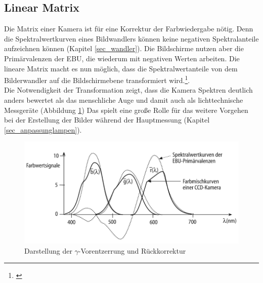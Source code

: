 \subsection{Linear Matrix}
\label{matrix}
Die Matrix einer Kamera ist für eine Korrektur der Farbwiedergabe nötig. Denn die Spektralwertkurven eines Bildwandlers können keine negativen Spektralanteile aufzeichnen können (Kapitel \ref{sec_wandler}). Die Bildschirme nutzen aber die Primärvalenzen der EBU, die wiederum mit negativen Werten arbeiten. Die lineare Matrix macht es nun möglich, dass die Spektralwertanteile von dem Bilderwandler auf die Bildschirmebene transformiert wird.\footnote{\cite[412-413]{schmidt}}.\\
Die Notwendigkeit der Transformation zeigt, dass die Kamera Spektren deutlich anders bewertet als das menschliche Auge und damit auch als lichttechnische Messgeräte (Abbildung \ref{b_matrix}) Das spielt eine große Rolle für das weitere Vorgehen bei der Erstellung der Bilder während der Hauptmessung (Kapitel \ref{sec_anpassunglampen}).

\begin{figure}[H]     %
\centering
\includegraphics[width=1.0\textwidth]{bilder/matrix} 
\caption {Darstellung der $\gamma$-Vorentzerrung und Rückkorrektur\protect\footnotemark}\label{b_matrix}
\end{figure}


